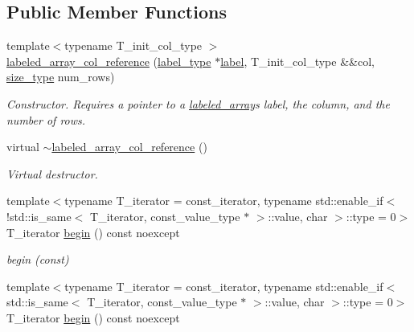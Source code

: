 \subsection*{Public Member Functions}
\begin{DoxyCompactItemize}
\item 
{\footnotesize template$<$typename T\+\_\+init\+\_\+col\+\_\+type $>$ }\\\hyperlink{classIceBRG_1_1labeled__array__col__reference_a487a048a6a6d1f26a128a58845675aa9}{labeled\+\_\+array\+\_\+col\+\_\+reference} (\hyperlink{classIceBRG_1_1labeled__array__col__reference_a8dc48f0fd0cd4b9813289a8b6db0f9b6}{label\+\_\+type} $\ast$\hyperlink{classIceBRG_1_1labeled__array__col__reference_a5221fd3e7f0cc79bea2977b99b43702c}{label}, T\+\_\+init\+\_\+col\+\_\+type \&\&col, \hyperlink{classIceBRG_1_1labeled__array__col__reference_a5b8295af3ddffec129715ff6b7744b7e}{size\+\_\+type} num\+\_\+rows)
\begin{DoxyCompactList}\small\item\em Constructor. Requires a pointer to a \hyperlink{classIceBRG_1_1labeled__array}{labeled\+\_\+array}\textquotesingle{}s label, the column, and the number of rows. \end{DoxyCompactList}\item 
virtual \hyperlink{classIceBRG_1_1labeled__array__col__reference_af08e8e753fe19e1e49267914b81529c3}{$\sim$labeled\+\_\+array\+\_\+col\+\_\+reference} ()
\begin{DoxyCompactList}\small\item\em Virtual destructor. \end{DoxyCompactList}\item 
{\footnotesize template$<$typename T\+\_\+iterator  = const\+\_\+iterator, typename std\+::enable\+\_\+if$<$!std\+::is\+\_\+same$<$ T\+\_\+iterator, const\+\_\+value\+\_\+type $\ast$ $>$\+::value, char $>$\+::type  = 0$>$ }\\T\+\_\+iterator \hyperlink{classIceBRG_1_1labeled__array__col__reference_a07b988e5a4f590833c6935c4f3193801}{begin} () const  noexcept
\begin{DoxyCompactList}\small\item\em begin (const) \end{DoxyCompactList}\item 
{\footnotesize template$<$typename T\+\_\+iterator  = const\+\_\+iterator, typename std\+::enable\+\_\+if$<$ std\+::is\+\_\+same$<$ T\+\_\+iterator, const\+\_\+value\+\_\+type $\ast$ $>$\+::value, char $>$\+::type  = 0$>$ }\\T\+\_\+iterator \hyperlink{classIceBRG_1_1labeled__array__col__reference_a07b988e5a4f590833c6935c4f3193801}{begin} () const  noexcept

\end{DoxyCompactItemize}
